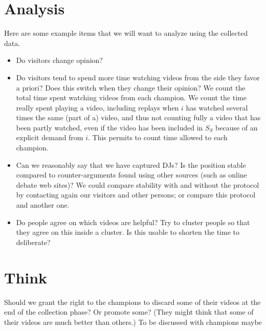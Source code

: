 \documentclass[version=3.21, pagesize, twoside=off, bibliography=totoc, DIV=calc, fontsize=12pt, a4paper]{scrartcl}
\begin{document}
\section{Analysis}
Here are some example items that we will want to analyze using the collected data.
\begin{itemize}
	\item Do visitors change opinion?
	\item Do visitors tend to spend more time watching videos from the side they favor a priori? Does this switch when they change their opinion? We count the total time spent watching videos from each champion. We count the time really spent playing a video, including replays when $i$ has watched several times the same (part of a) video, and thus not counting fully a video that has been partly watched, even if the video has been included in $S_S$ because of an explicit demand from $i$. This permits to count time allowed to each champion.
	\item Can we reasonably say that we have captured \acp{DJ}? Is the position stable compared to counter-arguments found using other sources (such as online debate web sites)? We could compare stability with and without the protocol by contacting again our visitors and other persons; or compare this protocol and another one.
	\item Do people agree on which videos are helpful? Try to cluster people so that they agree on this inside a cluster. Is this usable to shorten the time to deliberate?
\end{itemize}

\section{Think}
Should we grant the right to the champions to discard some of their videos at the end of the collection phase? Or promote some? (They might think that some of their videos are much better than others.) To be discussed with champions maybe


\end{document}

